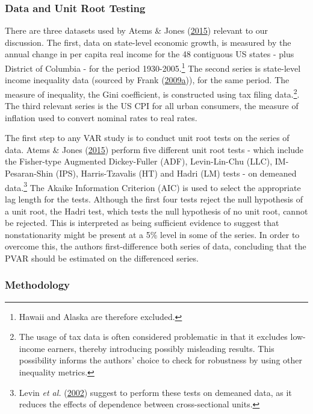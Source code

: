 \documentclass[11pt,preprint, authoryear]{elsarticle}
\numberwithin{equation}{section}
\numberwithin{figure}{section}
\numberwithin{table}{section}
\let\rmarkdownfootnote\footnote%
\def\footnote{\protect\rmarkdownfootnote}
\begin{document}
\hypertarget{data-and-unit-root-testing}{%
\subsubsection*{Data and Unit Root
Testing}\label{data-and-unit-root-testing}}

There are three datasets used by Atems \& Jones
(\protect\hyperlink{ref-atems}{2015}) relevant to our discussion. The
first, data on state-level economic growth, is measured by the annual
change in per capita real income for the 48 contiguous US states - plus
District of Columbia - for the period 1930-2005.\footnote{Hawaii and
  Alaska are therefore excluded.} The second series is state-level
income inequality data (sourced by Frank
(\protect\hyperlink{ref-frank}{2009}\protect\hyperlink{ref-frank}{a})),
for the same period. The measure of inequality, the Gini coefficient, is
constructed using tax filing data.\footnote{The usage of tax data is
  often considered problematic in that it excludes low-income earners,
  thereby introducing possibly misleading results. This possibility
  informs the authors' choice to check for robustness by using other
  inequality metrics.}. The third relevant series is the US CPI for all
urban consumers, the measure of inflation used to convert nominal rates
to real rates.

The first step to any VAR study is to conduct unit root tests on the
series of data. Atems \& Jones (\protect\hyperlink{ref-atems}{2015})
perform five different unit root tests - which include the Fisher-type
Augmented Dickey-Fuller (ADF), Levin-Lin-Chu (LLC), IM-Pesaran-Shin
(IPS), Harris-Tzavalis (HT) and Hadri (LM) tests - on demeaned
data.\footnote{Levin \emph{et al.} (\protect\hyperlink{ref-levin}{2002})
  suggest to perform these tests on demeaned data, as it reduces the
  effects of dependence between cross-sectional units.} The Akaike
Information Criterion (AIC) is used to select the appropriate lag length
for the tests. Although the first four tests reject the null hypothesis
of a unit root, the Hadri test, which tests the null hypothesis of no
unit root, cannot be rejected. This is interpreted as being sufficient
evidence to suggest that nonstationarity might be present at a 5\% level
in some of the series. In order to overcome this, the authors
first-difference both series of data, concluding that the PVAR should be
estimated on the differenced series.

\hypertarget{methodology}{%
\subsubsection*{Methodology}\label{methodology}}
\end{document}
